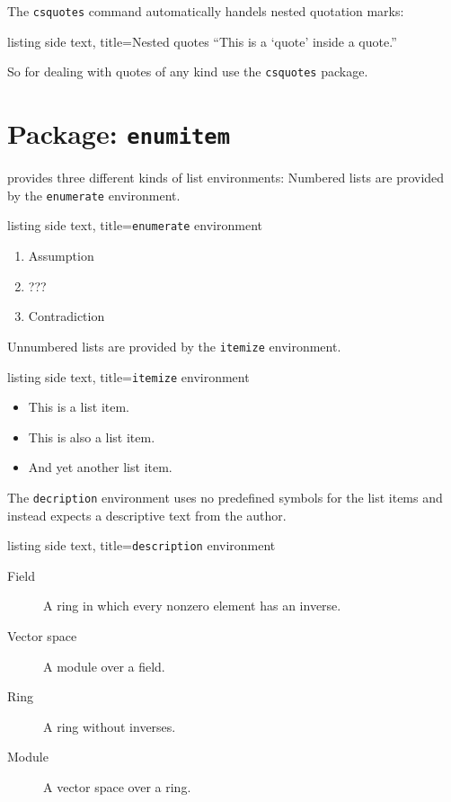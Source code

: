 The \texttt{csquotes} command automatically handels nested quotation marks:
\begin{tcblisting}{listing side text, title={Nested quotes}}
\enquote{This is a \enquote{quote} inside a quote.}
\end{tcblisting}
So for dealing with quotes of any kind use the \texttt{csquotes} package.





\section{Package: \texttt{enumitem}}

 provides three different kinds of list environments:
Numbered lists are provided by the \texttt{enumerate} environment.

\begin{tcblisting}{listing side text, title={\texttt{enumerate} environment}}
\begin{enumerate}
  \item
    Assumption
  \item
    ???
  \item
    Contradiction
\end{enumerate}
\end{tcblisting}
Unnumbered lists are provided by the \texttt{itemize} environment.
\begin{tcblisting}{listing side text, title={\texttt{itemize} environment}}
\begin{itemize}
  \item
    This is a list item.
  \item
    This is also a list item.
  \item
    And yet another list item.
\end{itemize}
\end{tcblisting}
The \texttt{decription} environment uses no predefined symbols for the list items and instead expects a descriptive text from the author.
\begin{tcblisting}{listing side text, title={\texttt{description} environment}}
\begin{description}
  \item[Field]
    A ring in which every nonzero element has an inverse.
  \item[Vector space]
    A module over a field.
  \item[Ring]
    A ring without inverses.
  \item[Module]
    A vector space over a ring.
\end{description}
\end{tcblisting}

